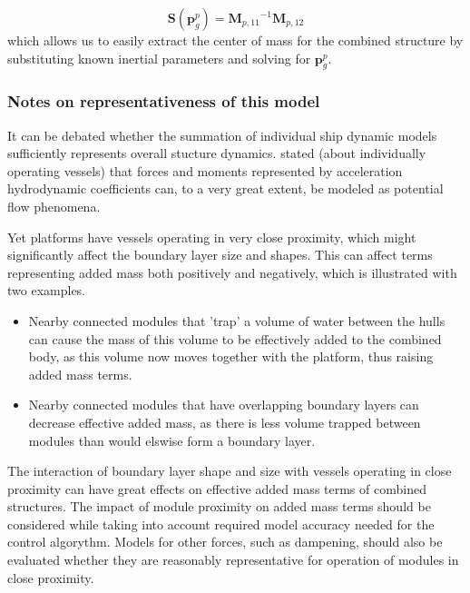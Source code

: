 \begin{equation}
	\textbf{S}(\textbf{p}_{g}^{p})  = {\textbf{M}_{p,11}}^{-1} \textbf{M}_{p,12} 
	\label{eq:centreOfMassFindR}
\end{equation}
which allows us to easily extract the center of mass for the combined structure by substituting known inertial parameters and solving for $\textbf{p}_{g}^{p}$.


\subsubsection{Notes on representativeness of this model}
It can be debated whether the summation of individual ship dynamic models sufficiently represents overall stucture dynamics.  \citet{humphreys1978prediction} stated (about individually operating vessels) that forces and moments represented by acceleration hydrodynamic coefficients can, to a very great extent, be modeled as potential flow phenomena. 

Yet platforms have vessels operating in very close proximity, which might significantly affect the boundary layer size and shapes. This can affect terms representing added mass both positively and negatively, which is illustrated with two examples. 
\begin{itemize}
	\item Nearby connected modules that 'trap' a volume of water between the hulls can cause the mass of this volume to be effectively added to the combined body, as this volume now moves together with the platform, thus raising added mass terms. 
	\item Nearby connected modules that have overlapping boundary layers can decrease effective added mass, as there is less volume trapped between modules than would elswise form a boundary layer. 
\end{itemize} 

The interaction of boundary layer shape and size with vessels operating in close proximity can have great effects on effective added mass terms of combined structures. The impact of module proximity on added mass terms should be considered while taking into account required model accuracy needed for the control algorythm. Models for other forces, such as dampening, should also be evaluated whether they are reasonably representative for operation of modules in close proximity. 